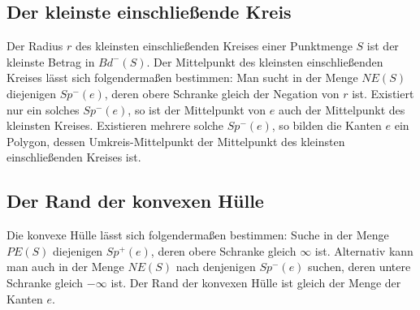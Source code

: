 \subsection*{Der kleinste einschließende Kreis}
Der Radius $r$ des kleinsten einschließenden Kreises einer Punktmenge $S$ ist der kleinste Betrag in $Bd^-(S)$. Der Mittelpunkt des kleinsten einschließenden Kreises lässt sich folgendermaßen bestimmen: Man sucht in der Menge $NE(S)$ diejenigen $Sp^-(e)$, deren obere Schranke gleich der Negation von $r$ ist. Existiert nur ein solches $Sp^-(e)$, so ist der Mittelpunkt von $e$ auch der Mittelpunkt des kleinsten Kreises. Existieren mehrere solche $Sp^-(e)$, so bilden die Kanten $e$ ein Polygon, dessen Umkreis-Mittelpunkt der Mittelpunkt des kleinsten einschließenden Kreises ist.

\subsection*{Der Rand der konvexen Hülle}
Die konvexe Hülle lässt sich folgendermaßen bestimmen: Suche in der Menge $PE(S)$ diejenigen $Sp^+(e)$, deren obere Schranke gleich $\infty$ ist. Alternativ kann man auch in der Menge $NE(S)$ nach denjenigen $Sp^-(e)$ suchen, deren untere Schranke gleich $-\infty$ ist. Der Rand der konvexen Hülle ist gleich der Menge der Kanten $e$.
